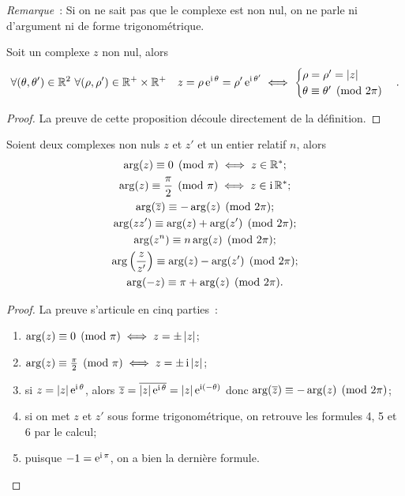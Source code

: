 \emph{Remarque}~: Si on ne sait pas que le complexe est non nul, on ne parle ni d'argument ni de forme trigonométrique.
\begin{prop}
  Soit un complexe $z$ non nul, alors
  \begin{equation}
    \forall (\theta, \theta') \in \mathbb{R}^2 \ \forall (\rho, \rho') \in \mathbb{R}^{+} \times \mathbb{R}^{+} \quad z=\rho \operatorname{e}^{\operatorname{i} \theta}=\rho' \operatorname{e}^{\operatorname{i} \theta'} \iff
    \begin{cases}
      \rho = \rho' = \left\lvert z\right\rvert \\
      \theta \equiv \theta' \pmod {2\pi}
    \end{cases}.
  \end{equation}
\end{prop}
\begin{proof}
  La preuve de cette proposition découle directement de la définition.
\end{proof}
%
\begin{prop}
  Soient deux complexes non nuls $z$ et $z'$ et un entier relatif $n$, alors
  \begin{gather}
    \arg(z) \equiv 0 \pmod {\pi} \iff z \in \mathbb{R}^*;\\
    \arg(z) \equiv \frac{\pi}{2} \pmod {\pi} \iff z \in \operatorname{i}\mathbb{R}^{*};\\
    \arg(\overline{z}) \equiv -\arg(z) \pmod {2\pi};\\
    \arg(z z') \equiv \arg(z) + \arg(z') \pmod {2\pi};\\
    \arg(z^n) \equiv n \arg(z) \pmod {2\pi};\\
    \arg \left(\frac{z}{z'} \right) \equiv \arg(z) - \arg(z')  \pmod {2\pi};\\
    \arg(-z) \equiv \pi + \arg(z) \pmod {2\pi}.
  \end{gather}
\end{prop}
\begin{proof}
  La preuve s'articule en cinq parties~:
  \begin{enumerate}
  \item $\arg(z) \equiv 0 \pmod {\pi} \iff z = \pm \left\lvert z\right\rvert$;
  \item $\arg(z) \equiv \frac{\pi}{2} \pmod {\pi} \iff z = \pm \operatorname{i} \left\lvert z\right\rvert$;
  \item si $z=\left\lvert z\right\rvert \operatorname{e}^{\operatorname{i} \theta}$, alors $\overline{z}=\overline{|z| \operatorname{e}^{\operatorname{i} \theta}}=|z| \operatorname{e}^{\operatorname{i} (-\theta)}$ donc $\arg(\overline{z}) \equiv -\arg(z) \pmod {2\pi}$;
  \item si on met $z$ et $z'$ sous forme trigonométrique, on retrouve les formules 4, 5 et 6 par le calcul;
  \item puisque $-1=\operatorname{e}^{\operatorname{i} \pi}$, on a bien la dernière formule.
  \end{enumerate}
\end{proof}

